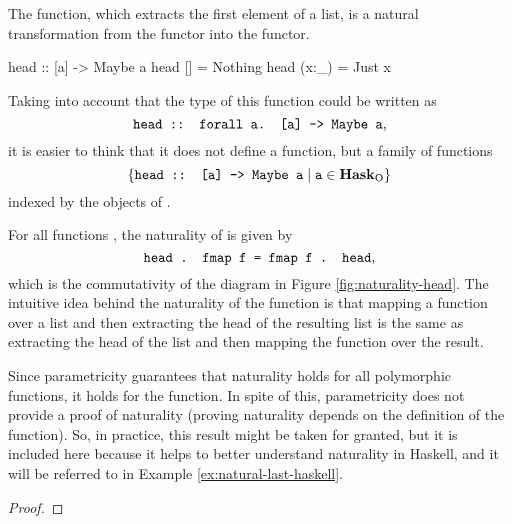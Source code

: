 \begin{example}
  \label{ex:natural-head-haskell}

  The  function, which extracts the first element of
  a list, is a natural transformation from the \texthaskell{[]}
  functor into the  functor.
  \begin{codehaskell}
    head :: [a] -> Maybe a
    head []    = Nothing
    head (x:_) = Just x
  \end{codehaskell}

  Taking into account that the type of this function could be written
  as
  \begin{equation*}
    \text{\texttt{head :: forall a. [a] -> Maybe a}}
    \text{,}
  \end{equation*}
  it is easier to think that it does not define a function, but a family
  of functions
  \begin{equation*}
    \{\text{\texttt{head :: [a] -> Maybe a}} \mid
    \text{\texttt{a}} \in \mathcal{\mathbf{Hask}}_{\operatorname{O}}\}
  \end{equation*}
  indexed by the objects of \hask.

  For all functions , the naturality of
   is given by
  \begin{equation}
    \label{eq:naturality-head}
    \text{\texttt{head . fmap f = fmap f . head}}
    \text{,}
  \end{equation}
  which is the commutativity of the diagram in Figure
  \ref{fig:naturality-head}. The intuitive idea behind the naturality
  of the  function is that mapping a function
   over a list and then extracting the head of the
  resulting list is the same as extracting the head of the list and
  then mapping the function  over the result.

  Since parametricity guarantees that naturality holds for all
  polymorphic functions, it holds for the  function.
  In spite of this, parametricity does not provide a proof of
  naturality (proving naturality depends on the definition of the
  function). So, in practice, this result might be taken for granted,
  but it is included here because it helps to better understand
  naturality in Haskell, and it will be referred to in Example
  \ref{ex:natural-last-haskell}.

  \begin{proof}


\end{proof}
\end{example}
